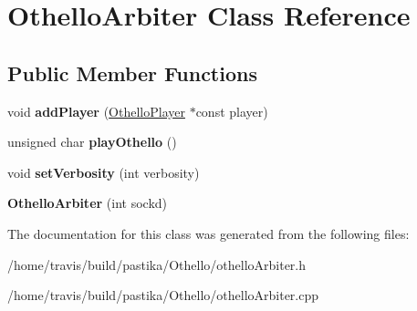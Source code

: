 \hypertarget{classOthelloArbiter}{\section{Othello\-Arbiter Class Reference}
\label{classOthelloArbiter}
}
\subsection*{Public Member Functions}
\begin{DoxyCompactItemize}
\item 
\hypertarget{classOthelloArbiter_a9262380107a3219aeb8b332a88fafcbf}{void {\bfseries add\-Player} (\hyperlink{classOthelloPlayer}{Othello\-Player} $\ast$const player)}\label{classOthelloArbiter_a9262380107a3219aeb8b332a88fafcbf}

\item 
\hypertarget{classOthelloArbiter_ae749a8f06d8037f8c193bd87a18611da}{unsigned char {\bfseries play\-Othello} ()}\label{classOthelloArbiter_ae749a8f06d8037f8c193bd87a18611da}

\item 
\hypertarget{classOthelloArbiter_a3d2341554a6be0ad0ecb46fc3aa35068}{void {\bfseries set\-Verbosity} (int verbosity)}\label{classOthelloArbiter_a3d2341554a6be0ad0ecb46fc3aa35068}

\item 
\hypertarget{classOthelloArbiter_a7bb8ba1e1db1b3cfc7033b88fb32f219}{{\bfseries Othello\-Arbiter} (int sockd)}\label{classOthelloArbiter_a7bb8ba1e1db1b3cfc7033b88fb32f219}

\end{DoxyCompactItemize}


The documentation for this class was generated from the following files\-:\begin{DoxyCompactItemize}
\item 
/home/travis/build/pastika/\-Othello/othello\-Arbiter.\-h\item 
/home/travis/build/pastika/\-Othello/othello\-Arbiter.\-cpp\end{DoxyCompactItemize}
